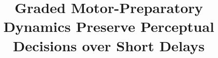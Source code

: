 \documentclass[a4paper,11pt]{article}
\title{Graded Motor-Preparatory Dynamics Preserve Perceptual Decisions over Short Delays}
\date{}
\newcommand{\1}{\mathbbm{1}}
\begin{document}
\linenumbers

\end{document}
